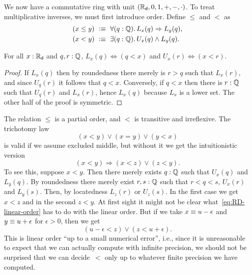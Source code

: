 We now have a commutative ring with unit $(\mathbb{R}_\mathsf{d}, 0, 1, {+}, {-}, {\cdot})$. To treat
multiplicative inverses, we must first introduce order. Define $\leq$ and $<$ as
%
\begin{align*}
  (x \leq y) &\ \defeq \ \fall{q : \Q} L_x(q) \Rightarrow L_y(q), \\
  (x < y)    &\ \defeq \ \exis{q : \Q} U_x(q) \land L_y(q).
\end{align*}

\begin{lem} \label{dedekind-in-cut-as-le}
  For all $x : \mathbb{R}_\mathsf{d}$ and $q, r : \mathbb{Q}$, $L_x(q) \Leftrightarrow (q < x)$ and $U_x(r)
  \Leftrightarrow (x < r)$.
\end{lem}

\begin{proof}
  If $L_x(q)$ then by roundedness there merely is $r > q$ such that $L_x(r)$, and since
  $U_q(r)$ it follows that $q < x$. Conversely, if $q < x$ then there is $r : \mathbb{Q}$ such
  that $U_q(r)$ and $L_x(r)$, hence $L_x(q)$ because $L_x$ is a lower set. The other half
  of the proof is symmetric.
\end{proof}

%
The relation $\leq$ is a partial order, and $<$ is transitive and irreflexive. The
trichotomy law
%
\begin{equation*}
  (x < y) \lor (x = y) \lor (y < x)
\end{equation*}
%
is valid if we assume excluded middle, but without it we get the intuitionistic version
%
\begin{equation} \label{eq:RD-linear-order}
  (x < y) \Rightarrow (x < z) \lor (z < y).
\end{equation}
%
To see this, suppose $x < y$. Then there merely exists $q : \mathbb{Q}$ such that $U_x(q)$ and
$L_y(q)$. By roundedness there merely exist $r, s : \mathbb{Q}$ such that $r < q < s$, $U_x(r)$
and $L_y(s)$. Then, by locatedness $L_z(r)$ or $U_z(s)$. In the first case we get $x < z$
and in the second $z < y$. At first sight it might not be clear
what~\eqref{eq:RD-linear-order} has to do with the linear order. But if we take $x \equiv
u - \epsilon$ and $y \equiv u + \epsilon$ for $\epsilon > 0$, then we get
%
\begin{equation*}
  (u - \epsilon < z) \lor (z < u + \epsilon).
\end{equation*}
%
This is linear order ``up to a small numerical error'', i.e., since it is unreasonable to
expect that we can actually compute with infinite precision, we should not be surprised
that we can decide~$<$ only up to whatever finite precision we have computed.

